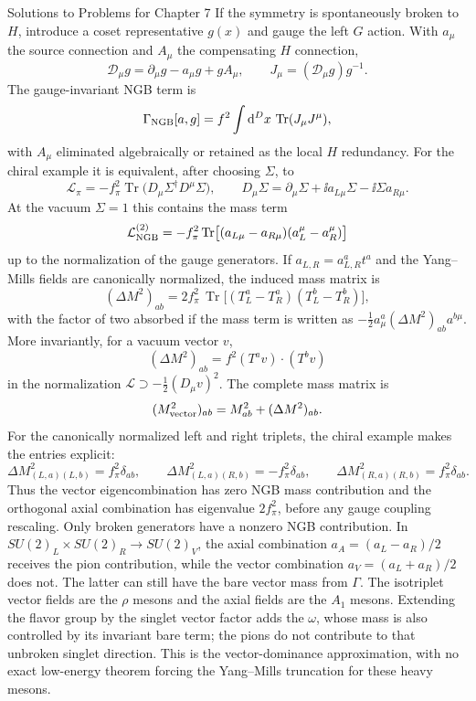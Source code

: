 \begin{bankssolutions}{Solutions to Problems for Chapter 7}
If the symmetry is spontaneously broken to $H$, introduce a coset
representative $g(x)$ and gauge the left $G$ action.  With $a_\mu$ the
source connection and $A_\mu$ the compensating $H$ connection,
\[
 \mathcal D_\mu g=\partial_\mu g-a_\mu g+gA_\mu,
 \qquad
 J_\mu=(\mathcal D_\mu g)g^{-1}.
\]
The gauge-invariant NGB term is
\[
 \Gamma_{\rm NGB}[a,g]
 =f^2\int\mathop{}\!\mathrm{d}^D x\,\operatorname{Tr}(J_\mu J^\mu),
\]
with $A_\mu$ eliminated algebraically or retained as the local $H$
redundancy.  For the chiral example it is equivalent, after choosing
$\Sigma$, to
\[
 \mathcal L_\pi
 =-f_\pi^2\operatorname{Tr}\bigl(D_\mu\Sigma^\dagger D^\mu\Sigma\bigr),
 \qquad
 D_\mu\Sigma=\partial_\mu\Sigma+\ii a_{L\mu}\Sigma
 -\ii\Sigma a_{R\mu}.
\]
At the vacuum $\Sigma=1$ this contains the mass term
\[
 \mathcal L_{\rm NGB}^{(2)}
 =-f_\pi^2\operatorname{Tr}\bigl[(a_{L\mu}-a_{R\mu})
 (a_L^\mu-a_R^\mu)\bigr]
\]
up to the normalization of the gauge generators.  If
$a_{L,R}=a_{L,R}^at^a$ and the Yang--Mills fields are canonically
normalized, the induced mass matrix is
\[
 (\Delta M^2)_{ab}
 =2f_\pi^2\,\operatorname{Tr}\bigl[(T_L^a-T_R^a)
 (T_L^b-T_R^b)\bigr],
\]
with the factor of two absorbed if the mass term is written as
$-\frac12a_\mu^a(\Delta M^2)_{ab}a^{b\mu}$.  More invariantly, for a vacuum
vector $v$,
\[
 (\Delta M^2)_{ab}=f^2(T^av)\cdot(T^bv)
\]
in the normalization $\mathcal L\supset-\frac12(D_\mu v)^2$.  The complete
mass matrix is
\[
 (M_{\rm vector}^2)_{ab}=M^2_{ab}+(\Delta M^2)_{ab}.
\]
For the canonically normalized left and right triplets, the chiral
example makes the entries explicit:
\[
 \Delta M^2_{(L,a)(L,b)}=f_\pi^2\delta_{ab},\qquad
 \Delta M^2_{(L,a)(R,b)}=-f_\pi^2\delta_{ab},\qquad
 \Delta M^2_{(R,a)(R,b)}=f_\pi^2\delta_{ab}.
\]
Thus the vector eigencombination has zero NGB mass contribution and the
orthogonal axial combination has eigenvalue $2f_\pi^2$, before any gauge
coupling rescaling.
Only broken generators have a nonzero NGB contribution.  In
$SU(2)_L\times SU(2)_R\to SU(2)_V$, the axial combination
$a_A=(a_L-a_R)/2$ receives the pion contribution, while the vector
combination $a_V=(a_L+a_R)/2$ does not.  The latter can still have the
bare vector mass from $\Gamma$.  The isotriplet vector fields are the
$\rho$ mesons and the axial fields are the $A_1$ mesons.  Extending the
flavor group by the singlet vector factor adds the $\omega$, whose mass is
also controlled by its invariant bare term; the pions do not contribute to
that unbroken singlet direction.  This is the vector-dominance
approximation, with no exact low-energy theorem forcing the Yang--Mills
truncation for these heavy mesons.

\end{bankssolutions}
